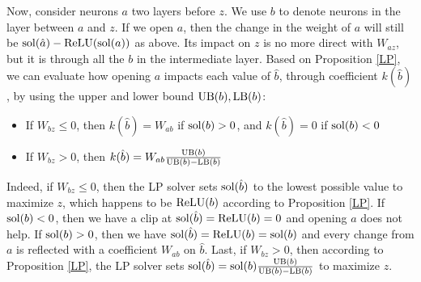 % 			

\medskip

Now, consider neurons $a$ two layers before $z$. We use $b$ to denote neurons in the layer between $a$ and $z$. If we open $a$, then the change in the weight of $a$ will still be $\mathrm{sol}(\hat{a})-\mathrm{ReLU}(\mathrm{sol}(a))$ as above. Its impact on $z$ is no more direct with $W_{az}$, but it is through all the $b$ in the intermediate layer. 
Based on Proposition \ref{LP}, we can evaluate how opening $a$ impacts each value of 
$\hat{b}$, through coefficient $k(\hat{b})$, by using the upper and lower bound
$\mathrm{UB}(b),\mathrm{LB}(b)$:
\begin{itemize}
 \item If $W_{bz}\leq0$, then $k(\hat{b})=W_{ab}$ if $\mathrm{sol}(b) > 0$, and $k(\hat{b})=0$ if $\mathrm{sol}(b) < 0$
 \item If $W_{bz}>0$, then $k(\hat{b})=W_{ab} \frac{\mathrm{UB}(b)}{\mathrm{UB}(b)-\mathrm{LB}(b)}$
\end{itemize}

Indeed, if $W_{bz}\leq0$, then the LP solver sets $\mathrm{sol}(\hat{b})$ to the lowest possible value to maximize $z$, which happens to be $\mathrm{ReLU}(b)$ according to Proposition \ref{LP}.
If $\mathrm{sol}(b) < 0$, then we have a clip at $\mathrm{sol}(\hat{b})=\mathrm{ReLU}(b)=0$ and opening $a$ does not help. If $\mathrm{sol}(b) > 0$, then we have $\mathrm{sol}(\hat{b})=\mathrm{ReLU}(b)=\mathrm{sol}(b)$ and every change from 
$a$ is reflected with a coefficient $W_{ab}$ on $\hat{b}$. 
Last, if $W_{bz}>0$, then according to Proposition \ref{LP}, the LP solver
sets $\mathrm{sol}(\hat{b}) = \mathrm{sol}(b) \frac{\mathrm{UB}(b)}{\mathrm{UB}(b)-\mathrm{LB}(b)}$ to maximize $z$.


